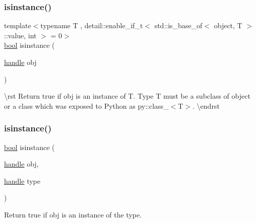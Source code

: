 \mbox{\label{group__python__builtins_gade020f155a1f133cc9e245bac2981280}} 
\subsubsection{\texorpdfstring{isinstance()}{isinstance()}\hspace{0.1cm}{\footnotesize\ttfamily [1/2]}}
{\footnotesize\ttfamily template$<$typename T , detail\+::enable\+\_\+if\+\_\+t$<$ std\+::is\+\_\+base\+\_\+of$<$ object, T $>$\+::value, int $>$  = 0$>$ \\
\mbox{\hyperlink{asdl_8h_af6a258d8f3ee5206d682d799316314b1}{bool}} isinstance (\begin{DoxyParamCaption}\item[{\mbox{\hyperlink{classhandle}{handle}}}]{obj }\end{DoxyParamCaption})}

\textbackslash{}rst Return true if {\ttfamily obj} is an instance of {\ttfamily T}. Type {\ttfamily T} must be a subclass of {\ttfamily object} or a class which was exposed to Python as {\ttfamily py\+::class\+\_\+$<$T$>$}. \textbackslash{}endrst \mbox{\label{group__python__builtins_ga563dccaeb6eca82ece3f56c5edfe838b}} 
\subsubsection{\texorpdfstring{isinstance()}{isinstance()}\hspace{0.1cm}{\footnotesize\ttfamily [2/2]}}
{\footnotesize\ttfamily \mbox{\hyperlink{asdl_8h_af6a258d8f3ee5206d682d799316314b1}{bool}} isinstance (\begin{DoxyParamCaption}\item[{\mbox{\hyperlink{classhandle}{handle}}}]{obj,  }\item[{\mbox{\hyperlink{classhandle}{handle}}}]{type }\end{DoxyParamCaption})\hspace{0.3cm}{\ttfamily [inline]}}

Return true if {\ttfamily obj} is an instance of the {\ttfamily type}. \mbox{\label{group__python__builtins_ga0f2342d8d9000a3bcef531c39e97c531}} 
